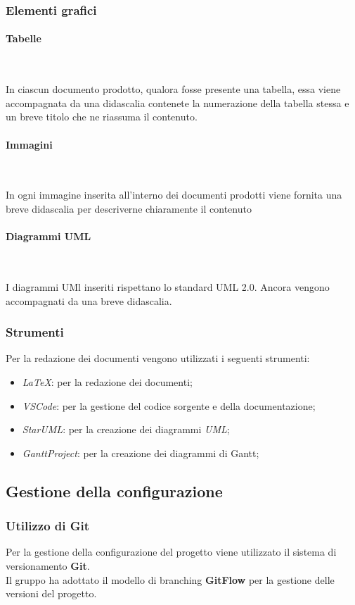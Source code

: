 \subsubsection{Elementi grafici}
\paragraph{Tabelle} ~

In ciascun documento prodotto, qualora fosse presente una tabella, essa viene accompagnata da una didascalia contenete la numerazione della tabella stessa e un breve titolo che ne riassuma il contenuto.\\

\paragraph{Immagini} ~

In ogni immagine inserita all'interno dei documenti prodotti viene fornita una breve didascalia per descriverne chiaramente il contenuto

\paragraph{Diagrammi UML} ~

I diagrammi UMl inseriti rispettano lo standard UML 2.0. Ancora vengono accompagnati da una breve didascalia.

\subsubsection{Strumenti}
Per la redazione dei documenti vengono utilizzati i seguenti strumenti:
\begin{itemize}
    \item \textit{LaTeX}: per la redazione dei documenti;
    \item \textit{VSCode}: per la gestione del codice sorgente e della documentazione;
    \item \textit{StarUML}: per la creazione dei diagrammi \textit{UML};
    \item \textit{GanttProject}: per la creazione dei diagrammi di Gantt;
\end{itemize}

\subsection{Gestione della configurazione}

\subsubsection{Utilizzo di Git}
Per la gestione della configurazione del progetto viene utilizzato il sistema di versionamento \textbf{Git}.\\
Il gruppo ha adottato il modello di branching \textbf{GitFlow} per la gestione delle versioni del progetto.\\


